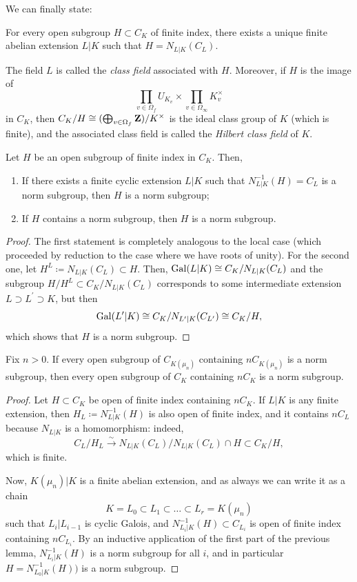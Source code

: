 \documentclass{article}
\begin{document}
We can finally state:
\begin{thm}
		For every open subgroup $H\subset C_K$ of finite index, there exists a unique finite abelian extension $L|K$ such that $H=N_{L|K}(C_L)$.
\end{thm}
\begin{rmk}
		The field $L$ is called the \emph{class field} associated with $H$. Moreover, if $H$ is the image of 
		\[
			\prod_{v\in \Omega_f} U_{K_v} \times \prod_{v\in \Omega_\infty} K_v^\times
		\]
		in $C_K$, then $C_K / H\cong (\bigoplus_{v\in \Omega_f} \mathbf{Z}) / K^\times$ is the ideal class group of $K$ (which is finite), and the associated class field is called the \emph{Hilbert class field} of $K$.
\end{rmk}
\begin{lem}
		Let $H$ be an open subgroup of finite index in $C_K$. Then,
		\begin{enumerate}
				\item If there exists a finite cyclic extension $L|K$ such that $N_{L|K}^{-1}(H)=C_L$ is a norm subgroup, then $H$ is a norm subgroup;
				\item If $H$ contains a norm subgroup, then $H$ is a norm subgroup.
		\end{enumerate}
\end{lem}
\begin{proof}
		The first statement is completely analogous to the local case (which proceeded by reduction to the case where we have roots of unity).
		For the second one, let $H^L\coloneqq N_{L|K}(C_L)\subset H$. Then, $\operatorname{Gal}(L|K)\cong C_K / N_{L|K}(C_L)$ and the subgroup $H/H^L\subset C_K / N_{L|K}(C_L)$ corresponds to some intermediate extension $L\supset L^\prime \supset K$, but then $$\operatorname{Gal}(L^\prime|K)\cong C_K / N_{L^\prime|K}(C_{L^\prime})\cong C_K / H,$$ which shows that $H$ is a norm subgroup.
\end{proof}
\begin{prop}
		Fix $n>0$. If every open subgroup of $C_{K(\mu_n)}$ containing $n C_{K(\mu_n)}$ is a norm subgroup, then every open subgroup of $C_K$ containing $n C_K$ is a norm subgroup.
\end{prop}
\begin{proof}
		Let $H\subset C_K$ be open of finite index containing $n C_K$. If $L|K$ is any finite extension, then $H_L\coloneqq N_{L|K}^{-1}(H)$ is also open of finite index, and it contains $n C_L$ because $N_{L|K}$ is a homomorphism: indeed,
		\[
			C_L / H_L \xrightarrow{\sim} N_{L|K}(C_L) / N_{L|K}(C_L)\cap H \subset C_K / H,
		\]
		which is finite.

		Now, $K(\mu_n)|K$ is a finite abelian extension, and as always we can write it as a chain 
		\[
			K=L_0 \subset L_1 \subset \ldots \subset L_r = K(\mu_n)
		\]
		such that $L_i|L_{i-1}$ is cyclic Galois, and $N_{L_i|K}^{-1}(H)\subset C_{L_i}$ is open of finite index containing $n C_{L_i}$. By an inductive application of the first part of the previous lemma, $N^{-1}_{L_i|K}(H)$ is a norm subgroup for all $i$, and in particular $H=N^{-1}_{L_0|K}(H))$ is a norm subgroup.
\end{proof}
\end{document}
